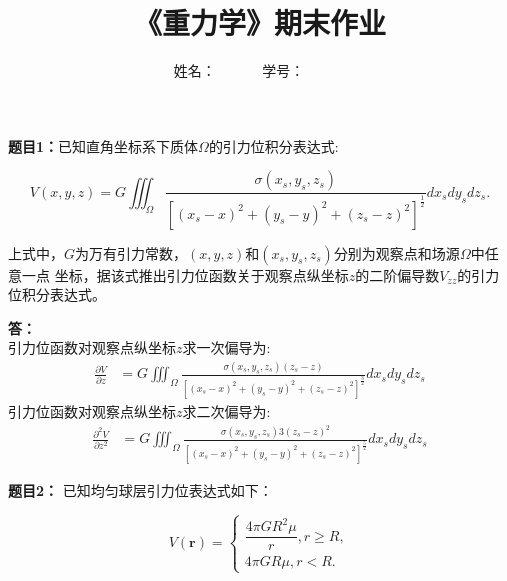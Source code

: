 \documentclass[12pt,a4paper]{article}
\begin{document}
\title{
{\heiti《重力学》期末作业}
}
\date{}

\author{
姓名：\underline{}~~~~~~
学号：\underline{}~~~~~~}

\maketitle

\noindent

\noindent
{\bf 题目1：}已知直角坐标系下质体$\Omega$的引力位积分表达式:

\begin{equation}
    V\left(x,y,z\right)=G\iiint_{\Omega}\frac{\sigma\left(x_s,y_s,
    z_s\right)}{\left[\left(x_s-x\right)^2+\left(y_s-y\right)^2+
    \left(z_s-z\right)^2\right]^{\frac12}}dx_sdy_sdz_s.
\end{equation}

\noindent 
上式中，$G$为万有引力常数，$(x, y, z)$和$(x_s, y_s, z_s)$分别为观察点和场源$\Omega$中任意一点
坐标，据该式推出引力位函数关于观察点纵坐标$z$的二阶偏导数$V_{zz}$的引力位积分表达式。

\vspace{5pt}
\noindent
{\bf 答：}
\noindent \\
引力位函数对观察点纵坐标$z$求一次偏导为:
\begin{equation}
    \begin{aligned}\frac{\partial V}{\partial z}& = G\iiint_{\Omega}\frac{\sigma(x_s,y_s,z_s)(z_s-z)}
        {[(x_s-x)^2+(y_s-y)^2+(z_s-z)^2]^{\frac32}}dx_sdy_sdz_s\end{aligned}
\end{equation}
引力位函数对观察点纵坐标$z$求二次偏导为:
\begin{equation}
    \begin{aligned}\frac{\partial^2 V}{\partial z^2}& = G\iiint_{\Omega}\frac{\sigma(x_s,y_s,z_s)3(z_s-z)^2}
        {[(x_s-x)^2+(y_s-y)^2+(z_s-z)^2]^{\frac52}}dx_sdy_sdz_s\end{aligned}
\end{equation}



\vspace{10pt}
\noindent
{\bf 题目2：} 已知均匀球层引力位表达式如下：

\begin{equation}
    V\left(\mathbf{r}\right)=\begin{cases}\dfrac{4\pi GR^2\mu}{r},r\geq R,\\4\pi GR\mu,r<R.\end{cases}
\end{equation}
\end{document}
